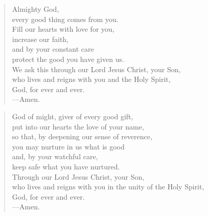 \prayer

\setlength{\leftmargini}{\prayerleftmargini}

\begin{verse}
Almighty God,\\
every good thing comes from you.\\
Fill our hearts with love for you,\\
increase our faith,\\
and by your constant care\\
protect the good you have given us.\\
We ask this through our Lord Jesus Christ, your Son,\\
who lives and reigns with you and the Holy Spirit,\\
God, for ever and ever.\\
{\color{red}---\thinspace}Amen.
\end{verse}


\begin{verse}
God of might, giver of every good gift,\\
put into our hearts the love of your name,\\
so that, by deepening our sense of reverence,\\
you may nurture in us what is good\\
and, by your watchful care,\\
keep safe what you have nurtured.\\
Through our Lord Jesus Christ, your Son,\\
who lives and reigns with you in the unity of the Holy Spirit,\\
God, for ever and ever.\\
{\color{red}---\thinspace}Amen.
\end{verse}

\setlength{\leftmargini}{\defleftmargini}